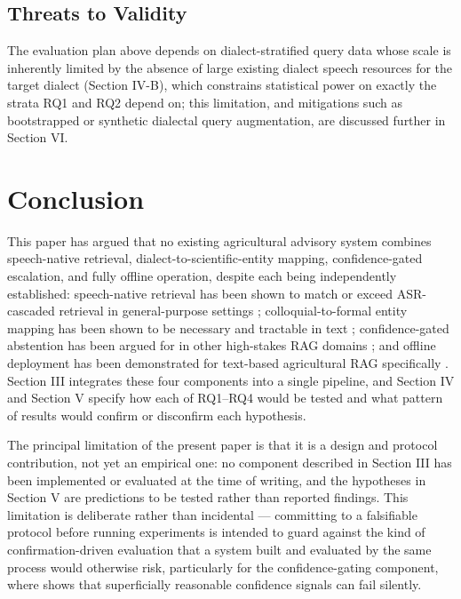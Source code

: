 \documentclass[conference]{IEEEtran}
\begin{document}
\subsection{Threats to Validity}
The evaluation plan above depends on dialect-stratified query data whose scale is inherently limited by the absence of large existing dialect speech resources for the target dialect (Section IV-B), which constrains statistical power on exactly the strata RQ1 and RQ2 depend on; this limitation, and mitigations such as bootstrapped or synthetic dialectal query augmentation, are discussed further in Section VI.

\section{Conclusion}

This paper has argued that no existing agricultural advisory system combines speech-native retrieval, dialect-to-scientific-entity mapping, confidence-gated escalation, and fully offline operation, despite each being independently established: speech-native retrieval has been shown to match or exceed ASR-cascaded retrieval in general-purpose settings \cite{min2025speechrag,google2025s2r}; colloquial-to-formal entity mapping has been shown to be necessary and tractable in text \cite{liu2025colloquialpest,hossain2026bengalirag}; confidence-gated abstention has been argued for in other high-stakes RAG domains \cite{abstinence2025}; and offline deployment has been demonstrated for text-based agricultural RAG specifically \cite{dubey2025aahar,hossain2026bengalirag}. Section III integrates these four components into a single pipeline, and Section IV and Section V specify how each of RQ1--RQ4 would be tested and what pattern of results would confirm or disconfirm each hypothesis.

The principal limitation of the present paper is that it is a design and protocol contribution, not yet an empirical one: no component described in Section III has been implemented or evaluated at the time of writing, and the hypotheses in Section V are predictions to be tested rather than reported findings. This limitation is deliberate rather than incidental --- committing to a falsifiable protocol before running experiments is intended to guard against the kind of confirmation-driven evaluation that a system built and evaluated by the same process would otherwise risk, particularly for the confidence-gating component, where \cite{intrygue2026} shows that superficially reasonable confidence signals can fail silently.
\end{document}
